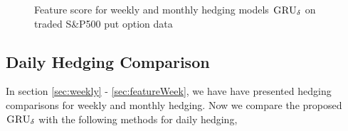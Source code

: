 \documentclass[letterpaper,12pt,titlepage,oneside,final]{book}
\numberwithin{equation}{section}
\theoremstyle{definition}
\newcommand{\model}{\textsc{GRU}_\delta}
\newcommand{\DKLs}{\bf\textsc{DKL}_{\text{SPL}}}
\begin{document}
\begin{figure}[htp]
\centering
\caption{Feature score for weekly and monthly hedging models $\model$ on traded S\&P500 put option  data} \label{fig:put1}
\end{figure}

\subsection{Daily Hedging Comparison}\label{sec:daily}
In section \ref{sec:weekly} - \ref{sec:featureWeek}, we have have presented hedging comparisons for weekly and monthly hedging. Now we compare the proposed $\model$  with the following methods for daily hedging,

\end{document}
